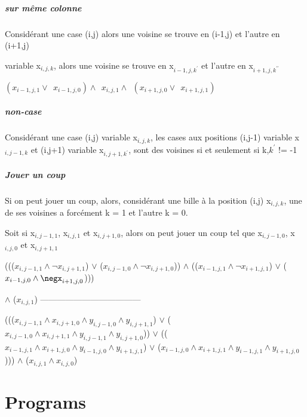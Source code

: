 \documentclass[utf8]{article}
\begin{document}
\subparagraph{sur même colonne}
Considérant une case (i,j)
alors une voisine se trouve en (i-1,j)
et l'autre en (i+1,j)

variable x$_{i,j,k}$,
alors une voisine se trouve en x$_{i-1,j,k^\prime}$ et l'autre en x$_{i+1,j,k^{\prime\prime}}$

$(x_{i-1,j,1} \lor ~~ x_{i-1,j,0} )
\land ~~
x_{i,j,1}
\land ~~
(x_{i+1,j,0} \lor ~~ x_{i+1,j,1})$

\subparagraph{non-case}
Considérant une case (i,j)
variable
x$_{i,j,k}$,
les cases aux positions
(i,j-1) variable x$_{i,j-1,k}$
et (i,j+1) variable x$_{i,j+1,k^\prime}$,
sont des voisines
si et seulement si k,$k^ {\prime}$ != -1

\subparagraph{Jouer un coup}
Si on peut jouer un coup, alors,
considérant une bille à la position (i,j) x$_{i,j,k}$,
une de ses voisines
a forcément k = 1 et l'autre k = 0.\newline

Soit si x$_{i,j-1,1}$, x$_{i,j,1}$ et x$_{i,j+1,0}$, alors on peut jouer un coup tel que x$_{i,j-1,0}$, x$_{i,j,0}$ et x$_{i,j+1,1}$
\newline

\begin{clips-code}
    ((($x_{i,j-1,1} \land \neg x_{i,j+1,1}$) $\lor$ ($ x_{i,j-1,0} \land \neg x_{i,j+1,0}$)) $\land$ (($x_{i-1,j,1} \land \neg x_{i+1,j,1}$) $\lor$ ($ x_{i-1,j,0} \land \negx_{i+1,j,0}$)))

    $\land$ ($x_{i,j,1}$)
------------------------------------

    ((($ x_{i,j-1,1}  \land x_{i,j+1,0} \land y_{i,j-1,0} \land y_{i,j+1,1} $) $\lor$ ($ x_{i,j-1,0} \land x_{i,j+1,1} \land y_{i,j-1,1} \land y_{i,j+1,0}$))
    $\lor$
    (($x_{i-1,j,1} \land x_{i+1,j,0} \land y_{i-1,j,0} \land y_{i+1,j,1}$) $\lor$ ($ x_{i-1,j,0} \land x_{i+1,j,1} \land y_{i-1,j,1} \land y_{i+1,j,0}$)))
    $\land$ ($x_{i,j,1} \land x_{i,j,0}$)



\end{clips-code}


\newpage

\section{Programs}
\end{document}

